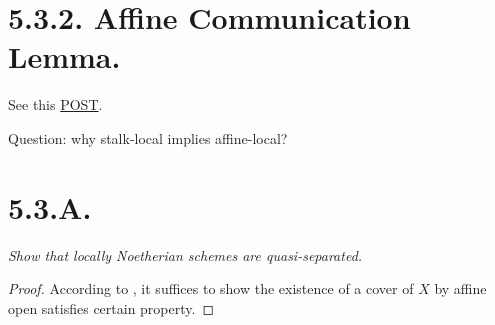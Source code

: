 \section{5.3.2. Affine Communication Lemma.}

See this \href{http://mathbabysteps.blogspot.com/2016/12/affine-communication-lemma.html}{POST}.

Question: why stalk-local implies affine-local?

\section{5.3.A.}
\textit{Show that locally Noetherian schemes are quasi-separated.}

\begin{proof}
	According to , it suffices to show the existence of a cover of $X$ by affine open satisfies certain property. 
\end{proof}